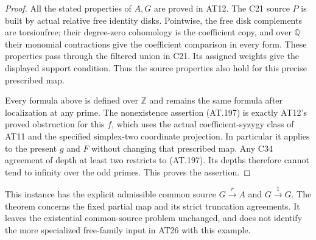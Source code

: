 \begin{proof}
All the stated properties of $A,G$ are proved in AT12.
The C21 source $P$ is built by actual relative free identity
disks. Pointwise, the free disk complements are torsionfree;
their degree-zero cohomology is the coefficient copy, and
over $\mathbb Q$ their monomial contractions give the
coefficient comparison in every form. These properties pass
through the filtered union in C21. Its assigned weights give
the displayed support condition. Thus the source properties
also hold for this precise prescribed map.

Every formula above is defined over $\mathbb Z$ and remains
the same formula after localization at any prime. The
nonexistence assertion \textup{(AT.197)} is exactly AT12's
proved obstruction for this $f$, which uses the actual
coefficient-syzygy class of AT11 and the specified simplex-two
coordinate projection. In particular it applies to the
present $g$ and $F$ without changing that prescribed map.
Any C34 agreement of depth at least two restricts to
\textup{(AT.197)}. Its depths therefore cannot tend to infinity
over the odd primes. This proves the assertion.
\end{proof}

This instance has the explicit admissible common source
$G\xrightarrow{r}A$ and $G\xrightarrow{1}G$.
The theorem concerns the fixed partial map and its strict
truncation agreements. It leaves the existential common-source
problem unchanged, and does not identify the more specialized
free-family input in AT26 with this example.
